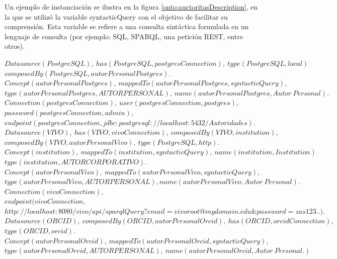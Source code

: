 Un ejemplo de instanciación se ilustra en la figura \ref{onto:auctoritasDescription}, en la que se utilizó la variable syntacticQuery con el objetivo de facilitar su comprensión. Esta variable se refiere a una consulta sintáctica formulada en un lenguaje de consulta (por ejemplo: SQL, SPARQL, una petición REST, entre otros).

\begin{minipage}{\textwidth}
$Datasource(PostgreSQL), \ has(PostgreSQL, postgresConnection), \ type(PostgreSQL,local)$ \\
$composedBy(PostgreSQL, autorPersonalPostgres).$ \\
$Concept(autorPersonalPostgres), \ mappedTo(autorPersonalPostgres, syntacticQuery),$ \\
$type(autorPersonalPostgres,AUTORPERSONAL), \ name(autorPersonalPostgres, Autor \ Personal).$\\
$Connection(postgresConnection), \ user(postgresConnection,postgres),$ \\
$password(postgresConnection,admin),$ \\
$endpoint(postgresConnection, jdbc{:}postgresql{:}//localhost{:}5432/Autoridades).$ \\
$Datasource(VIVO), \ has(VIVO, vivoConnection), \ composedBy(VIVO,institution),$ \\
$composedBy(VIVO,autorPersonalVivo), \ type(PostgreSQL,http).$ \\
$Concept(institution), \ mappedTo(institution,syntacticQuery), \ name(institution, Institution)$ \\
$type(institution,AUTORCORPORATIVO).$\\
$Concept(autorPersonalVivo), \ mappedTo(autorPersonalVivo, syntacticQuery),$ \\
$type(autorPersonalVivo, AUTORPERSONAL), name(autorPersonalVivo, Autor \ Personal).$ \\
$Connection(vivoConnection),$\\
$endpoint(vivoConnection, $\\
$http{:}//localhost{:}8080/vivo/api/sparqlQuery?email{=}vivoroot@mydomain.edu\&password{=}zas123..).$\\
$Datasource(ORCID), \ composedBy(ORCID,autorPersonalOrcid), \ has(ORCID,orcidConnection),$ \\
$type(ORCID, orcid).$ \\
$Concept(autorPersonalOrcid), \ mappedTo(autorPersonalOrcid, syntacticQuery),$\\
$type(autorPersonalOrcid,AUTORPERSONAL), \ name(autorPersonalOrcid, Autor \ Personal.)$ \\

\end{minipage}
